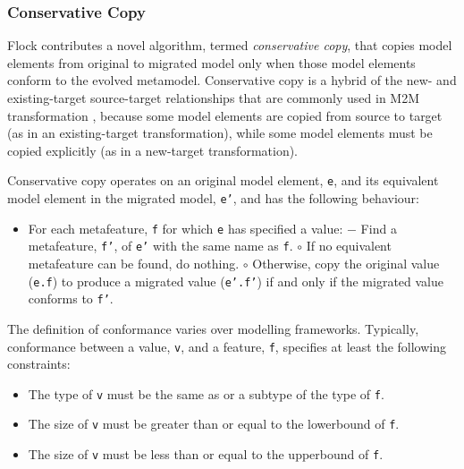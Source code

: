 \subsubsection{Conservative Copy}
\label{subsubsec:conservative_copying}
Flock contributes a novel algorithm, termed \emph{conservative copy}, that copies model elements from original to migrated model only when those model elements conform to the evolved metamodel. Conservative copy is a hybrid of the new- and existing-target source-target relationships that are commonly used in M2M transformation \cite{czarnecki06survey}, because some model elements are copied from source to target (as in an existing-target transformation), while some model elements must be copied explicitly (as in a new-target transformation).

Conservative copy operates on an original model element, \texttt{e}, and its equivalent model element in the migrated model, \texttt{e'}, and has the following behaviour:

\begin{itemize}
	\item For each metafeature, \texttt{f} for which \texttt{e} has specified a value:
		\subitem $-$ Find a metafeature, \texttt{f'}, of \texttt{e'} with the same name as \texttt{f}.
			\subsubitem $\circ$ If no equivalent metafeature can be found, do nothing.
			\subsubitem $\circ$ Otherwise, copy the original value (\texttt{e.f}) to produce a migrated value (\texttt{e'.f'}) if and only if the migrated value conforms to \texttt{f'}.
\end{itemize}

The definition of conformance varies over modelling frameworks. Typically, conformance between a value, \texttt{v}, and a feature, \texttt{f}, specifies at least the following constraints:

\begin{itemize}
	\item The type of \texttt{v} must be the same as or a subtype of the type of \texttt{f}.
	\item The size of \texttt{v} must be greater than or equal to the lowerbound of \texttt{f}.
	\item The size of \texttt{v} must be less than or equal to the upperbound of \texttt{f}.
\end{itemize}

